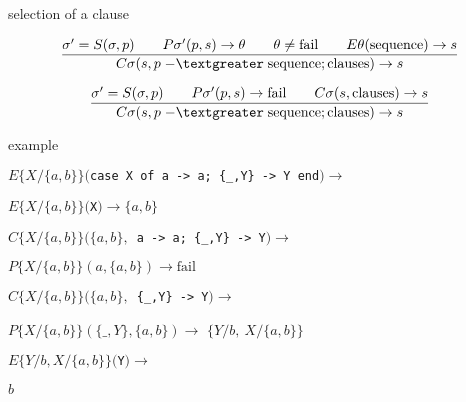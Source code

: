 \begin{frame}{selection of a clause}

$$\frac{
  \sigma' = S(\sigma, p) \qquad
  P\sigma'(p, s) \rightarrow \theta \qquad
  \theta \not = {\rm fail} \qquad
  E\theta({\rm sequence}) \rightarrow s}{
C\sigma(s, p \;{\rm -\textgreater}\;    {\rm sequence} ; {\rm clauses}) \rightarrow s}$$

\pause \vspace{10pt}

$$\frac{
  \sigma' = S(\sigma, p) \qquad
  P\sigma'(p, s) \rightarrow {\rm fail} \qquad
  C\sigma(s, {\rm clauses}) \rightarrow s}{
C\sigma(s, p \;{\rm -\textgreater}\;  {\rm sequence} ; {\rm clauses}) \rightarrow s}$$


\end{frame}

\begin{frame}{example}

\begin{eval}
  \pause$E\lbrace X/\lbrace a,b\rbrace\rbrace(${\tt case X of a -> a; \{\_,Y\} -> Y end}$) \rightarrow$ 
\end{eval}

\begin{eval}
   \hspace{40pt}\pause$E\lbrace X/\lbrace a,b\rbrace\rbrace(${\tt X}$) \rightarrow \lbrace a,b\rbrace$
\end{eval}

\begin{eval}
   \pause $C\lbrace X/\lbrace a,b\rbrace\rbrace(\lbrace a,b\rbrace, ${\tt \ a -> a; \{\_,Y\} -> Y}$) \rightarrow$ 
\end{eval}
\begin{eval}
   \hspace{40pt}\pause $P\lbrace X/\lbrace a,b\rbrace\rbrace( a, \lbrace a,b\rbrace) \rightarrow \mathrm{fail}$
\end{eval}

\begin{eval}
   \pause $C\lbrace X/\lbrace a,b\rbrace\rbrace(\lbrace a,b\rbrace, ${\tt \  \{\_,Y\} -> Y}$) \rightarrow$ 
\end{eval}
\begin{eval}
   \hspace{40pt}\pause $P\lbrace X/\lbrace a,b\rbrace\rbrace(\{\_, Y\}, \lbrace a,b\rbrace) \rightarrow $ \pause $\lbrace Y/b,\  X/\lbrace a,b\rbrace\rbrace$
\end{eval}

\begin{eval}
  \pause$E\lbrace Y/b, X/\lbrace a,b\rbrace\rbrace(${\tt Y}$) \rightarrow $
\end{eval}
\begin{eval}
  \pause$b$
\end{eval}
  
\end{frame}


